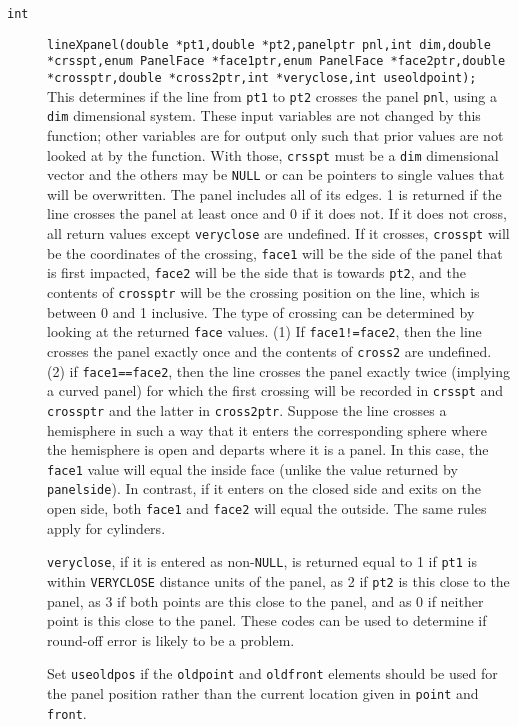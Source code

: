 \documentclass {scrbook}
\newcommand {\ttt} {\texttt}
\begin{document}
\begin{description}
\item[\ttt{int}]
\ttt{lineXpanel(double *pt1,double *pt2,panelptr pnl,int dim,double *crsspt,enum PanelFace *face1ptr,enum PanelFace *face2ptr,double *crossptr,double *cross2ptr,int *veryclose,int useoldpoint);}
\hfill \\
This determines if the line from \ttt{pt1} to \ttt{pt2} crosses the panel \ttt{pnl}, using a \ttt{dim} dimensional system. These input variables are not changed by this function; other variables are for output only such that prior values are not looked at by the function. With those, \ttt{crsspt} must be a \ttt{dim} dimensional vector and the others may be \ttt{NULL} or can be pointers to single values that will be overwritten. The panel includes all of its edges. 1 is returned if the line crosses the panel at least once and 0 if it does not. If it does not cross, all return values except \ttt{veryclose} are undefined. If it crosses, \ttt{crosspt} will be the coordinates of the crossing, \ttt{face1} will be the side of the panel that is first impacted, \ttt{face2} will be the side that is towards \ttt{pt2}, and the contents of \ttt{crossptr} will be the crossing position on the line, which is between 0 and 1 inclusive. The type of crossing can be determined by looking at the returned \ttt{face} values. (1) If \ttt{face1!=face2}, then the line crosses the panel exactly once and the contents of \ttt{cross2} are undefined. (2) if \ttt{face1==face2}, then the line crosses the panel exactly twice (implying a curved panel) for which the first crossing will be recorded in \ttt{crsspt} and \ttt{crossptr} and the latter in \ttt{cross2ptr}. Suppose the line crosses a hemisphere in such a way that it enters the corresponding sphere where the hemisphere is open and departs where it is a panel. In this case, the \ttt{face1} value will equal the inside face (unlike the value returned by \ttt{panelside}). In contrast, if it enters on the closed side and exits on the open side, both \ttt{face1} and \ttt{face2} will equal the outside. The same rules apply for cylinders.

\ttt{veryclose}, if it is entered as non-\ttt{NULL}, is returned equal to 1 if \ttt{pt1} is within \ttt{VERYCLOSE} distance units of the panel, as 2 if \ttt{pt2} is this close to the panel, as 3 if both points are this close to the panel, and as 0 if neither point is this close to the panel. These codes can be used to determine if round-off error is likely to be a problem.

Set \ttt{useoldpos} if the \ttt{oldpoint} and \ttt{oldfront} elements should be used for the panel position rather than the current location given in \ttt{point} and \ttt{front}.


\end{description}
\end{document}

